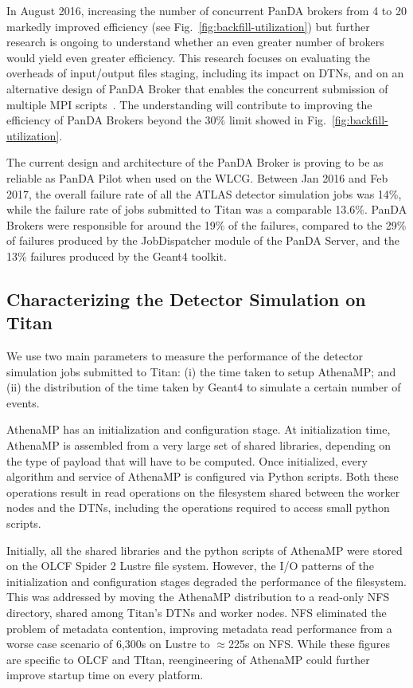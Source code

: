 In August 2016, increasing the number of concurrent PanDA brokers from 4 to
20 markedly improved efficiency (see Fig.~\ref{fig:backfill-utilization}) but
further research is ongoing to understand whether an even greater number of
brokers would yield even greater efficiency. This research focuses on
evaluating the overheads of input/output files staging, including its impact
on DTNs, and on an alternative design of PanDA Broker that enables the
concurrent submission of multiple MPI scripts~\cite{barreiro2016panda}. The
understanding will contribute to improving the efficiency of PanDA Brokers
beyond the 30\% limit showed in Fig.~\ref{fig:backfill-utilization}.

The current design and architecture of the PanDA Broker is proving to be as
reliable as PanDA Pilot when used on the WLCG\@. Between Jan 2016 and Feb
2017, the overall failure rate of all the ATLAS detector simulation jobs was
14\%, while the failure rate of jobs submitted to Titan was a comparable
13.6\%. PanDA Brokers were responsible for around the 19\% of the failures,
compared to the 29\% of failures produced by the JobDispatcher module of the
PanDA Server, and the 13\% failures produced by the Geant4 toolkit. 

\subsection{Characterizing the Detector Simulation on
Titan}\label{ssec:athenamp_titan}

We use two main parameters to measure the performance of the detector
simulation jobs submitted to Titan: (i) the time taken to setup AthenaMP\@;
and (ii) the distribution of the time taken by Geant4 to simulate a certain
number of events.

AthenaMP has an initialization and configuration stage. At initialization
time, AthenaMP is assembled from a very large set of shared libraries,
depending on the type of payload that will have to be computed. Once
initialized, every algorithm and service of AthenaMP is configured via Python
scripts. Both these operations result in read operations on the filesystem
shared between the worker nodes and the DTNs, including the operations
required to access small python scripts.

Initially, all the shared libraries and the python scripts of AthenaMP were
stored on the OLCF Spider 2 Lustre file system. However, the I/O patterns of
the initialization and configuration stages degraded the performance of the
filesystem. This was addressed by moving the AthenaMP distribution to a
read-only NFS directory, shared among Titan's DTNs and worker nodes. NFS
eliminated the problem of metadata contention, improving metadata read
performance from a worse case scenario of 6,300s on Lustre to \(\approx\)225s
on NFS\@. While these figures are specific to OLCF and TItan, reengineering
of AthenaMP could further improve startup time on every platform.

